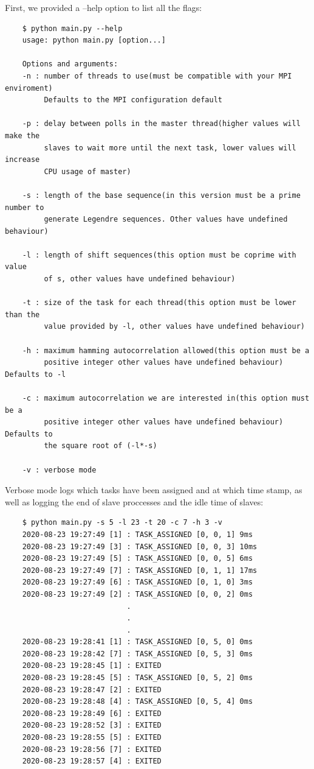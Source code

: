   First, we provided a --help option to list all the flags:
  \begin{lstlisting}
    $ python main.py --help
    usage: python main.py [option...]

    Options and arguments:
    -n : number of threads to use(must be compatible with your MPI enviroment)
         Defaults to the MPI configuration default

    -p : delay between polls in the master thread(higher values will make the
         slaves to wait more until the next task, lower values will increase
         CPU usage of master)

    -s : length of the base sequence(in this version must be a prime number to
         generate Legendre sequences. Other values have undefined behaviour)

    -l : length of shift sequences(this option must be coprime with value
         of s, other values have undefined behaviour)

    -t : size of the task for each thread(this option must be lower than the
         value provided by -l, other values have undefined behaviour)

    -h : maximum hamming autocorrelation allowed(this option must be a
         positive integer other values have undefined behaviour) Defaults to -l

    -c : maximum autocorrelation we are interested in(this option must be a
         positive integer other values have undefined behaviour) Defaults to
         the square root of (-l*-s)

    -v : verbose mode
  \end{lstlisting}

  Verbose mode logs which tasks have been assigned and at which time stamp, as
  well as logging the end of slave proccesses and the idle time of slaves:

  \begin{lstlisting}
    $ python main.py -s 5 -l 23 -t 20 -c 7 -h 3 -v
    2020-08-23 19:27:49 [1] : TASK_ASSIGNED [0, 0, 1] 9ms
    2020-08-23 19:27:49 [3] : TASK_ASSIGNED [0, 0, 3] 10ms
    2020-08-23 19:27:49 [5] : TASK_ASSIGNED [0, 0, 5] 6ms
    2020-08-23 19:27:49 [7] : TASK_ASSIGNED [0, 1, 1] 17ms
    2020-08-23 19:27:49 [6] : TASK_ASSIGNED [0, 1, 0] 3ms
    2020-08-23 19:27:49 [2] : TASK_ASSIGNED [0, 0, 2] 0ms
                            .
                            .
                            .
    2020-08-23 19:28:41 [1] : TASK_ASSIGNED [0, 5, 0] 0ms
    2020-08-23 19:28:42 [7] : TASK_ASSIGNED [0, 5, 3] 0ms
    2020-08-23 19:28:45 [1] : EXITED
    2020-08-23 19:28:45 [5] : TASK_ASSIGNED [0, 5, 2] 0ms
    2020-08-23 19:28:47 [2] : EXITED
    2020-08-23 19:28:48 [4] : TASK_ASSIGNED [0, 5, 4] 0ms
    2020-08-23 19:28:49 [6] : EXITED
    2020-08-23 19:28:52 [3] : EXITED
    2020-08-23 19:28:55 [5] : EXITED
    2020-08-23 19:28:56 [7] : EXITED
    2020-08-23 19:28:57 [4] : EXITED

  \end{lstlisting}

